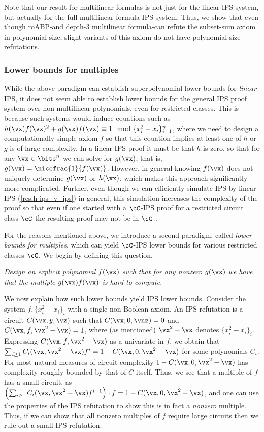 \documentclass{toc}
\begin{document}
Note that our result for multilinear-formulas is not just for the linear-IPS system, but actually for the full multilinear-formula-IPS system. Thus, we show that even though roABP-\lIPS and depth-3 multilinear formula-\lbIPS can refute the subset-sum axiom in polynomial size, slight variants of this axiom do not have polynomial-size refutations.

\subsubsection{Lower bounds for multiples}\label{sec:intro:lbs-mult}

While the above paradigm can establish superpolynomial lower bounds for \emph{linear}-IPS, it does not seem able to establish lower bounds for the general IPS proof system over non-multilinear polynomials, even for restricted classes.  This is because such systems would induce equations such as $h(\vx) f(\vx)^2+g(\vx) f(\vx)\equiv 1 \mod \{x_i^2-x_i\}_{i=1}^n$, where we need to design a computationally simple axiom $f$ so that this equation implies at least one of $h$ or $g$ is of large complexity.  In a linear-IPS proof it must be that $h$ is zero, so that for any $\vx\in\bits^n$ we can solve for $g(\vx)$, that is, $g(\vx)=\nicefrac{1}{f(\vx)}$.  However, in general knowing $f(\vx)$ does not uniquely determine $g(\vx)$ or $h(\vx)$, which makes this approach significantly more complicated.  Further, even though we can efficiently simulate IPS by linear-IPS (\autoref{res:h-ips_v_ips}) in general, this simulation increases the complexity of the proof so that even if one started with a $\cC$-IPS proof for a restricted circuit class $\cC$ the resulting \lIPS proof may not be in $\cC$-\lIPS.
%

For the reasons mentioned above, %
we introduce a second paradigm, called \emph{lower bounds for multiples}, which can yield $\cC$-IPS lower bounds for various restricted classes $\cC$.  We begin by defining this question.

\begin{goal}
\emph{Design an explicit polynomial $f(\vx)$ such that for any nonzero $g(\vx)$ we have that the multiple $g(\vx)f(\vx)$ is hard to compute.}
\end{goal}

We now explain how such lower bounds yield IPS lower bounds.  Consider the system $f,\{x_i^2-x_i\}_i$ with a single non-Boolean axiom.  An IPS refutation is a circuit $C(\vx,y,\vz)$ such that $C(\vx,0,\vnz)=0$ and $C(\vx,f,\vx^2-\vx)=1$, where (as mentioned) $\vx^2-\vx$ denotes $\{x_i^2-x_i\}_i$.  Expressing $C(\vx,f,\vx^2-\vx)$ as a univariate in $f$, we obtain that $\sum_{i\ge 1} C_i(\vx,\vx^2-\vx) f^i = 1-C(\vx,0,\vx^2-\vx)$ for some polynomials $C_i$.  For most natural measures of circuit complexity $1-C(\vx,0,\vx^2-\vx)$ has complexity roughly bounded by that of $C$ itself.  Thus, we see that a multiple of $f$ has a small circuit, as $\left(\sum_{i\ge 1} C_i(\vx,\vx^2-\vx) f^{i-1}\right)\cdot f=1-C(\vx,0,\vx^2-\vx)$, and one can use the properties of the IPS refutation to show this is in fact a \emph{nonzero} multiple.  Thus, if we can show that all nonzero multiples of $f$ require large circuits then we rule out a small IPS refutation.
\end{document}
